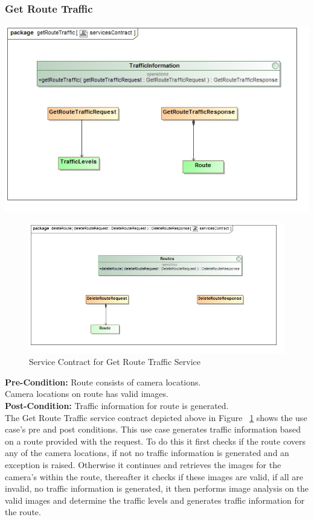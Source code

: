 \documentclass[a4paper,12pt]{article}
\begin{document}
\subsubsection{Get Route Traffic}
\includegraphics[width=\textwidth]{images/scDetermine_Traffic.jpg}
\begin{figure}[ht]
\includegraphics[width=\textwidth]{images/scDelete_Route.jpg}
\caption{Service Contract for Get Route Traffic Service}
\label{fig:sc_getroutetraffic}
\end{figure}

\textbf{Pre-Condition: }
Route consists of camera locations.\\
Camera locations on route has valid images.\\
\textbf{Post-Condition: }
Traffic information for route is generated.\\

The Get Route Traffic service contract depicted above in Figure ~\ref{fig:sc_getroutetraffic} shows the use case's pre and post conditions. This use case generates traffic information based on a route provided with the request. To do this it first checks if the route covers any of the camera locations, if not no traffic information is generated and an exception is raised. Otherwise it continues and retrieves the images for the camera's within the route, thereafter it checks if these images are valid, if all are invalid, no traffic information is generated, it then performs image analysis on the valid images and determine the traffic levels and generates traffic information for the route.
\end{document}

